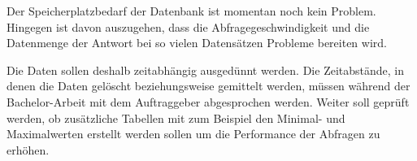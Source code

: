 \noindent
Der Speicherplatzbedarf der Datenbank ist momentan noch kein Problem. Hingegen ist davon auszugehen, dass die Abfragegeschwindigkeit und die Datenmenge der Antwort bei so vielen Datensätzen Probleme bereiten wird.
\newline

\noindent
Die Daten sollen deshalb zeitabhängig ausgedünnt werden. Die Zeitabstände, in denen die Daten gelöscht beziehungsweise gemittelt werden, müssen während der Bachelor-Arbeit mit dem Auftraggeber abgesprochen werden. Weiter soll geprüft werden, ob zusätzliche Tabellen mit zum Beispiel den Minimal- und Maximalwerten erstellt werden sollen um die Performance der Abfragen zu erhöhen.


